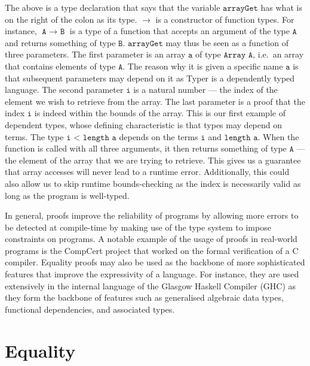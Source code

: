 \documentclass[12pt,twoside,maitrise]{dms}
\theoremstyle{definition}
\numberwithin{equation}{section}
\numberwithin{table}{chapter}
\numberwithin{figure}{chapter}
\newcommand\id[1] {\texttt{#1}}
\newcommand\fn[1] {\texttt{#1}}
\begin{document}
The above is a type declaration that says that the variable $\fn{arrayGet}$ has
what is on the right of the colon as its type. $\rightarrow$ is a constructor of
function types. For instance, $\fn{A $\rightarrow$ B}$ is a type of a function
that accepts an argument of the type $\fn{A}$ and returns something of type
$\fn{B}$. $\fn{arrayGet}$ may thus be seen as a function of three parameters.
The first parameter is an array $\fn{a}$ of type $\fn{Array A}$, i.e.\ an array
that contains elements of type $\fn{A}$. The reason why it is given a specific
name $\fn{a}$ is that subsequent parameters may depend on it as Typer is a
dependently typed language. The second parameter $\fn{i}$ is a natural number
--- the index of the element we wish to retrieve from the array. The last
parameter is a proof that the index $\id{i}$ is indeed within the bounds of the
array. This is our first example of dependent types, whose defining
characteristic is that types may depend on terms. The type $\fn{i < length a}$
depends on the terms $\fn{i}$ and $\fn{length a}$. When the function is called
with all three arguments, it then returns something of type $\fn{A}$ --- the
element of the array that we are trying to retrieve. This gives us a guarantee
that array accesses will never lead to a runtime error. Additionally, this could
also allow us to skip runtime bounds-checking as the index is necessarily valid
as long as the program is well-typed.

In general, proofs improve the reliability of programs by allowing more errors
to be detected at compile-time by making use of the type system to impose
constraints on programs. A notable example of the usage of proofs in real-world
programs is the CompCert project that worked on the formal verification of a C
compiler\cite{Leroy-Compcert-CACM}. Equality proofs may also be used as the
backbone of more sophisticated features that improve the expressivity of a
language. For instance, they are used extensively in the internal language of
the Glasgow Haskell Compiler (GHC) as they form the backbone of features such as
generalised algebraic data types, functional dependencies, and associated
types\cite{sulzmann2007systemfeq}.

\section{Equality}

\end{document}
